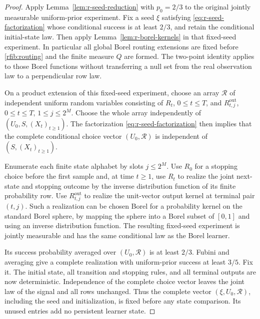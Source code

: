 \begin{proof}
Apply Lemma~\ref{lem:r-seed-reduction} with \(p_0=2/3\) to the
original jointly measurable uniform-prior experiment.  Fix a seed
\(\xi\) satisfying \eqref{eq:r-seed-factorization} whose conditional
success is at least \(2/3\), and retain the conditional initial-state
law.  Then apply Lemma~\ref{lem:r-borel-kernels} in that fixed-seed
experiment.  In particular all global Borel routing extensions are fixed
before \eqref{rfib:routing} and the finite measure \(Q\) are formed.
The two-point identity applies to those Borel functions without transferring
a null set from the real observation law to a perpendicular row law.

On a product extension of this fixed-seed experiment, choose an array
\(\mathcal R\) of independent uniform random variables consisting of
\(R_t\), \(0\le t\le T\), and
\(R^{\mathrm{out}}_{t,j}\), \(0\le t\le T\),
\(1\le j\le2^M\).  Choose the whole array independently of
\((U_0,S,(X_t)_{t\ge1})\).  The factorization
\eqref{eq:r-seed-factorization} then implies that the complete
conditional choice vector \((U_0,\mathcal R)\) is independent of
\((S,(X_t)_{t\ge1})\).

Enumerate each finite state alphabet by slots \(j\le2^M\).  Use
\(R_0\) for a stopping choice before the first sample and, at time
\(t\ge1\), use \(R_t\) to realize the joint next-state and stopping
outcome by the inverse distribution function of its finite probability
row.  Use \(R^{\mathrm{out}}_{t,j}\) to realize the unit-vector output
kernel at terminal pair \((t,j)\).  Such a realization can be chosen
Borel for a probability kernel on the standard Borel sphere, by mapping
the sphere into a Borel subset of \([0,1]\) and using an inverse
distribution function.  The resulting fixed-seed experiment is jointly
measurable and has the same conditional law as the Borel learner.

Its success probability averaged over \((U_0,\mathcal R)\) is at
least \(2/3\).  Fubini and averaging give a complete realization with
uniform-prior success at least \(3/5\).  Fix it.  The initial state,
all transition and stopping rules, and all terminal outputs are now
deterministic.  Independence of the complete choice vector leaves the
joint law of the signal and all rows unchanged.  Thus the complete vector
\((\xi,U_0,\mathcal R)\), including the seed and initialization, is
fixed before any state comparison.  Its unused entries add no persistent
learner state.


\end{proof}
